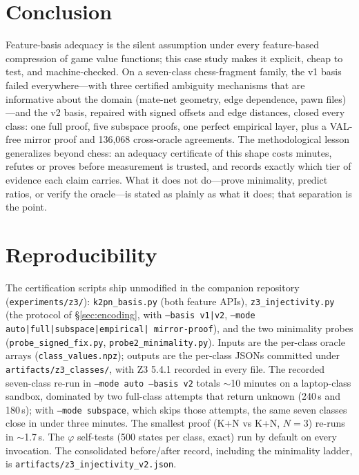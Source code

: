 \documentclass[conference]{IEEEtran}
\begin{document}
\section{Conclusion}
Feature-basis adequacy is the silent assumption under every feature-based
compression of game value functions; this case study makes it explicit,
cheap to test, and machine-checked. On a seven-class chess-fragment family,
the v1 basis failed everywhere---with three certified ambiguity mechanisms
that are informative about the domain (mate-net geometry, edge dependence,
pawn files)---and the v2 basis, repaired with signed offsets and edge
distances, closed every class: one full proof, five subspace proofs, one
perfect empirical layer, plus a VAL-free mirror proof and 136{,}068
cross-oracle agreements. The methodological lesson generalizes beyond
chess: an adequacy certificate of this shape costs minutes, refutes or
proves before measurement is trusted, and records exactly which tier of
evidence each claim carries. What it does not do---prove minimality,
predict ratios, or verify the oracle---is stated as plainly as what it
does; that separation is the point.

\appendices
\section{Reproducibility}
The certification scripts ship unmodified in the companion repository
(\texttt{experiments/z3/}): \texttt{k2pn\_basis.py} (both feature APIs),
\texttt{z3\_injectivity.py} (the protocol of \S\ref{sec:encoding}, with
\texttt{--basis v1|v2}, \texttt{--mode auto|full|subspace|empirical|
mirror-proof}), and the two minimality probes
(\texttt{probe\_signed\_fix.py}, \texttt{probe2\_minimality.py}). Inputs
are the per-class oracle arrays (\texttt{class\_values.npz}); outputs are
the per-class JSONs committed under \texttt{artifacts/z3\_classes/}, with
Z3 5.4.1 recorded in every file. The recorded seven-class re-run in
\texttt{--mode auto --basis v2} totals $\sim$10 minutes on a laptop-class
sandbox, dominated by two full-class attempts that return unknown
(240\,s and 180\,s); with \texttt{--mode subspace}, which skips those
attempts, the same seven classes close in under three minutes. The smallest
proof (K+N vs K+N, $N{=}3$) re-runs in $\sim$1.7\,s.
The $\varphi$ self-tests (500 states per class, exact) run by default on
every invocation. The consolidated before/after record, including the
minimality ladder, is \texttt{artifacts/z3\_injectivity\_v2.json}.



\end{document}
